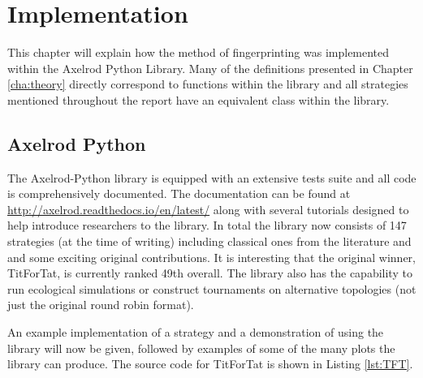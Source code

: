 
\chapter{Implementation}\label{cha:implementation}

This chapter will explain how the method of fingerprinting was implemented within the Axelrod Python Library.
Many of the definitions presented in Chapter \ref{cha:theory} directly correspond to functions within the library and all strategies mentioned throughout the report have an equivalent class within the library.

\section{Axelrod Python}

The Axelrod-Python library is equipped with an extensive tests suite and all code is comprehensively documented.
The documentation can be found at \url{http://axelrod.readthedocs.io/en/latest/} along with several tutorials designed to help introduce researchers to the library.
In total the library now consists of 147 strategies (at the time of writing) including classical ones from the literature and and some exciting original contributions.
It is interesting that the original winner, TitForTat, is currently ranked 49th overall.
The library also has the capability to run ecological simulations or construct tournaments on alternative topologies (not just the original round robin format).

An example implementation of a strategy and a demonstration of using the library will now be given, followed by examples of some of the many plots the library can produce.
The source code for TitForTat is shown in Listing \ref{lst:TFT}.

